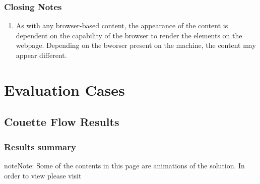 \documentclass[letterpaper,10pt,english]{sphinxmanual}
\begin{document}
\subsubsection{Closing Notes}
\label{\detokenize{couettepyfiles/documentation:closing-notes}}\begin{enumerate}
\item {} 
As with any browser-based content, the appearance of the content is dependent on the capability of the browser to render the elements on the webpage. Depending on the bworser present on the machine, the content may appear different.

\end{enumerate}


\section{Evaluation Cases}
\label{\detokenize{results:evaluation-cases}}\label{\detokenize{results::doc}}\label{\detokenize{results:testcases-main}}

\subsection{Couette Flow Results}
\label{\detokenize{results:couette-flow-results}}\label{\detokenize{results:test-cases}}

\subsubsection{Results summary}
\label{\detokenize{cases/results:results-summary}}\label{\detokenize{cases/results::doc}}
\begin{sphinxadmonition}{note}{Note:}
Some of the contents in this page are animations of the solution. In order to view please visit 
\end{sphinxadmonition}
\end{document}
